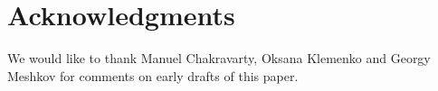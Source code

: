 \documentclass[runningheads]{llncs}
\begin{document}






    \section*{Acknowledgments}

    We would like to thank Manuel Chakravarty, Oksana Klemenko and Georgy Meshkov for comments on early drafts of this paper.

    
    
\end{document}
